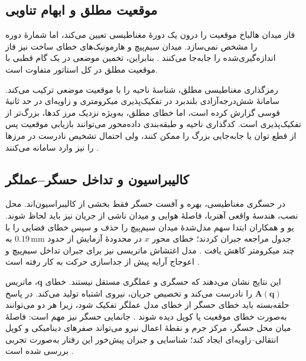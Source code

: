 \subsection{موقعیت مطلق و ابهام تناوبی}
\label{subsec:absolute-magnetic-position}

فاز میدان هالباخ موقعیت را درون یک دورهٔ مغناطیسی تعیین می‌کند، اما شمارهٔ دوره را مشخص نمی‌سازد. میدان سیم‌پیچ و هارمونیک‌های خطای ساخت نیز فاز اندازه‌گیری‌شده را جابه‌جا می‌کنند \cite{yuResearchElectromagneticDrive2024}. بنابراین، تخمین موضعی در یک گام قطبی با موقعیت مطلق در کل استاتور متفاوت است.

رمزگذاری مغناطیسی مطلق، شناسهٔ ناحیه را با موقعیت موضعی ترکیب می‌کند. سامانهٔ شش‌درجه‌آزادی بلندبرد در \cite{zhangLongrange6DOFAbsolute2024} تفکیک‌پذیری میکرومتری و زاویه‌ای در حد ثانیهٔ قوسی گزارش کرده است، اما خطای مطلق، به‌ویژه نزدیک مرز کدها، بزرگ‌تر از تفکیک‌پذیری است. کدگذاری ناحیه و طبقه‌بندی داده‌محور می‌توانند بازیابی موقعیت پس از قطع توان یا جابه‌جایی بزرگ را ممکن کنند، ولی احتمال تشخیص نادرست در مرزها را نیز وارد سامانه می‌کنند \cite{zhangLongrange6DOFAbsolute2024,yanPassiveMoverPose2025}.

\subsection{کالیبراسیون و تداخل حسگر--عملگر}
\label{subsec:sensor-calibration-interference}

در حسگری مغناطیسی، بهره و آفست حسگر فقط بخشی از کالیبراسیون‌اند. محل نصب، هندسهٔ واقعی آهنربا، فاصلهٔ هوایی و میدان ناشی از جریان نیز باید لحاظ شوند. یو و همکاران ابتدا سهم مدل‌شدهٔ میدان سیم‌پیچ را حذف و سپس خطای فضایی را با جدول مراجعه جبران کردند؛ خطای محور $x$ در محدودهٔ آزمایش از حدود $0.19\,\mathrm{mm}$ به چند میکرومتر کاهش یافت \cite{yuResearchElectromagneticDrive2024}. مدل اغتشاش ماتریسی نیز برای جبران تداخل سیم‌پیچ و اعوجاج آرایه پیش از جداسازی حرکت به کار رفته است \cite{yuResearchKeyTechnology2024}.

این نتایج نشان می‌دهند که حسگری و عملگری مستقل نیستند. خطای $\mathbf{q}$، ماتریس $\mathbf{A}(\mathbf{q})$ را نادرست می‌کند و تخصیص جریان، نیروی اشتباه تولید می‌کند. در پاسخ حلقه‌بسته باید خطای حسگر از خطای مدل عملگر تفکیک شود، زیرا هر دو می‌توانند به‌صورت خطای موقعیت یا کوپل دیده شوند \cite{chenModelCalibrationInconsistent2024,wangNovelAlgorithmForce2025}. جانمایی حسگر نیز مهم است: فاصلهٔ میان محل حسگر، مرکز جرم و نقطهٔ اعمال نیرو می‌تواند صفرهای دینامیکی و کوپل انتقالی--زاویه‌ای ایجاد کند؛ شناسایی و جبران پیش‌خور این رفتار به‌صورت تجربی بررسی شده است \cite{nakataHighlyResponsiveDrive2025}.

